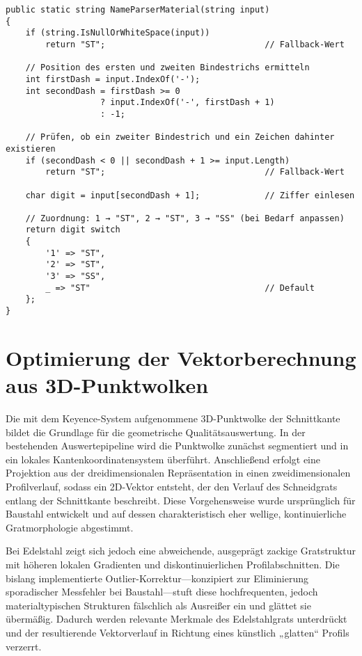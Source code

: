 \begin{lstlisting}[language={[Sharp]C}, caption={Werkstoffabhängiges Routing der Handscanner-Setups}, label={lst:messzellen-routing}]
public static string NameParserMaterial(string input)
{
    if (string.IsNullOrWhiteSpace(input))
        return "ST";                                // Fallback-Wert

    // Position des ersten und zweiten Bindestrichs ermitteln
    int firstDash = input.IndexOf('-');
    int secondDash = firstDash >= 0
                   ? input.IndexOf('-', firstDash + 1)
                   : -1;

    // Prüfen, ob ein zweiter Bindestrich und ein Zeichen dahinter existieren
    if (secondDash < 0 || secondDash + 1 >= input.Length)
        return "ST";                                // Fallback-Wert

    char digit = input[secondDash + 1];             // Ziffer einlesen

    // Zuordnung: 1 → "ST", 2 → "ST", 3 → "SS" (bei Bedarf anpassen)
    return digit switch
    {
        '1' => "ST",
        '2' => "ST",
        '3' => "SS",
        _ => "ST"                                   // Default
    };
}
\end{lstlisting}

\section{Optimierung der Vektorberechnung aus 3D-Punktwolken}

Die mit dem Keyence-System aufgenommene 3D-Punktwolke der Schnittkante bildet die Grundlage für die geometrische Qualitätsauswertung. In der bestehenden Auswertepipeline wird die Punktwolke zunächst segmentiert und in ein lokales Kantenkoordinatensystem überführt. Anschließend erfolgt eine Projektion aus der dreidimensionalen Repräsentation in einen zweidimensionalen Profilverlauf, sodass ein 2D-Vektor entsteht, der den Verlauf des Schneidgrats entlang der Schnittkante beschreibt. Diese Vorgehensweise wurde ursprünglich für Baustahl entwickelt und auf dessen charakteristisch eher wellige, kontinuierliche Gratmorphologie abgestimmt.

Bei Edelstahl zeigt sich jedoch eine abweichende, ausgeprägt zackige Gratstruktur mit höheren lokalen Gradienten und diskontinuierlichen Profilabschnitten. Die bislang implementierte Outlier-Korrektur—konzipiert zur Eliminierung sporadischer Messfehler bei Baustahl—stuft diese hochfrequenten, jedoch materialtypischen Strukturen fälschlich als Ausreißer ein und glättet sie übermäßig. Dadurch werden relevante Merkmale des Edelstahlgrats unterdrückt und der resultierende Vektorverlauf in Richtung eines künstlich „glatten“ Profils verzerrt.

